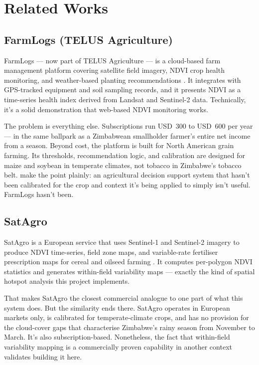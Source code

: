\documentclass[12pt,a4paper]{report}
\begin{document}
\section{Related Works}

\subsection{FarmLogs (TELUS Agriculture)}

FarmLogs — now part of TELUS Agriculture — is a cloud-based farm management platform covering satellite field imagery, NDVI crop health monitoring, and weather-based planting recommendations \citep{farmerline2023}. It integrates with GPS-tracked equipment and soil sampling records, and it presents NDVI as a time-series health index derived from Landsat and Sentinel-2 data. Technically, it's a solid demonstration that web-based NDVI monitoring works.

The problem is everything else. Subscriptions run USD~300 to USD~600 per year \citep{wolfert2017} — in the same ballpark as a Zimbabwean smallholder farmer's entire net income from a season. Beyond cost, the platform is built for North American grain farming. Its thresholds, recommendation logic, and calibration are designed for maize and soybean in temperate climates, not tobacco in Zimbabwe's tobacco belt. \citet{liakos2018} make the point plainly: an agricultural decision support system that hasn't been calibrated for the crop and context it's being applied to simply isn't useful. FarmLogs hasn't been.

\subsection{SatAgro}

SatAgro is a European service that uses Sentinel-1 and Sentinel-2 imagery to produce NDVI time-series, field zone maps, and variable-rate fertiliser prescription maps for cereal and oilseed farming \citep{satagtro2023}. It computes per-polygon NDVI statistics and generates within-field variability maps — exactly the kind of spatial hotspot analysis this project implements.

That makes SatAgro the closest commercial analogue to one part of what this system does. But the similarity ends there. SatAgro operates in European markets only, is calibrated for temperate-climate crops, and has no provision for the cloud-cover gaps that characterise Zimbabwe's rainy season from November to March. It's also subscription-based. Nonetheless, the fact that within-field variability mapping is a commercially proven capability in another context validates building it here.
\end{document}
